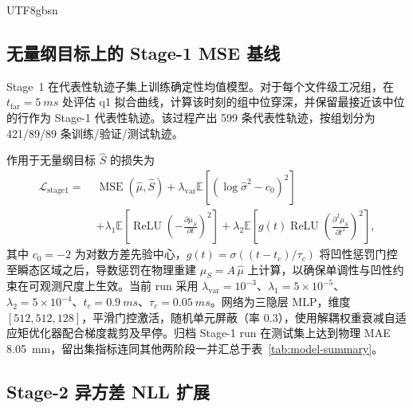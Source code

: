 \documentclass[english, 12pt, a4paper, elec, utf8, a-2b, online]{aaltothesis}
\begin{document}
\begin{CJK*}{UTF8}{gbsn}
\subsection{无量纲目标上的 Stage-1 MSE 基线}

Stage~1 在代表性轨迹子集上训练确定性均值模型。对于每个文件级工况组，在 $t_{\mathrm{far}}=\SI{5}{ms}$ 处评估 q1 拟合曲线，计算该时刻的组中位穿深，并保留最接近该中位的行作为 Stage-1 代表性轨迹。该过程产出 599 条代表性轨迹，按组划分为 421/89/89 条训练/验证/测试轨迹。

作用于无量纲目标 $\hat{S}$ 的损失为
\[
\begin{aligned}
\mathcal{L}_{\mathrm{stage1}}
=\;&
\operatorname{MSE}\!\left(\hat{\mu},\hat{S}\right)
+\lambda_{\mathrm{var}}
\mathbb{E}\!\left[\left(\log \hat{\sigma}^2-c_0\right)^2\right]\\
&+\lambda_{1}
\mathbb{E}\!\left[\operatorname{ReLU}\!\left(-\frac{\partial \mu_S}{\partial t}\right)^2\right]
+\lambda_{2}
\mathbb{E}\!\left[g(t)\operatorname{ReLU}\!\left(\frac{\partial^2 \mu_S}{\partial t^2}\right)^2\right],
\end{aligned}
\]
其中 $c_0=-2$ 为对数方差先验中心，$g(t)=\sigma((t-t_c)/\tau_c)$ 将凹性惩罚门控至瞬态区域之后，导数惩罚在物理重建 $\mu_S=A\,\hat{\mu}$ 上计算，以确保单调性与凹性约束在可观测尺度上生效。当前 run 采用 \(\lambda_{\mathrm{var}}=10^{-3}\)、\(\lambda_1=5\times10^{-5}\)、\(\lambda_2=5\times10^{-4}\)、\(t_c=\SI{0.9}{ms}\)、\(\tau_c=\SI{0.05}{ms}\)。网络为三隐层 MLP，维度 $[512,512,128]$，平滑门控激活，随机单元屏蔽（率 0.3），使用解耦权重衰减自适应矩优化器配合梯度裁剪及早停。归档 Stage-1 run 在测试集上达到物理 MAE \SI{8.05}{mm}，留出集指标连同其他两阶段一并汇总于表~\ref{tab:model-summary}。

\subsection{Stage-2 异方差 NLL 扩展}


\end{CJK*}
\end{document}
